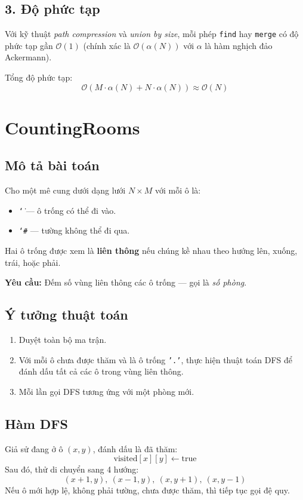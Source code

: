 \documentclass{article}
\begin{document}
	\subsection*{3. Độ phức tạp}
	Với kỹ thuật \textit{path compression} và \textit{union by size}, mỗi phép \texttt{find} hay \texttt{merge} có độ phức tạp gần $\mathcal{O}(1)$ (chính xác là $\mathcal{O}(\alpha(N))$ với $\alpha$ là hàm nghịch đảo Ackermann).
	
	Tổng độ phức tạp:
	\[
	\mathcal{O}(M \cdot \alpha(N) + N \cdot \alpha(N)) \approx \mathcal{O}(N)
	\]
	
	\section{CountingRooms}
	\subsection*{Mô tả bài toán}
	Cho một mê cung dưới dạng lưới $N \times M$ với mỗi ô là:
	\begin{itemize}
		\item \texttt{\char`\.} — ô trống có thể đi vào.
		\item \texttt{\char`\#} — tường không thể đi qua.
	\end{itemize}
	
	Hai ô trống được xem là \textbf{liên thông} nếu chúng kề nhau theo hướng lên, xuống, trái, hoặc phải.
	
	\textbf{Yêu cầu:} Đếm số vùng liên thông các ô trống — gọi là \textit{số phòng}.
	\subsection*{Ý tưởng thuật toán}
	
	\begin{enumerate}
		\item Duyệt toàn bộ ma trận.
		\item Với mỗi ô chưa được thăm và là ô trống \texttt{'.'}, thực hiện thuật toán DFS để đánh dấu tất cả các ô trong vùng liên thông.
		\item Mỗi lần gọi DFS tương ứng với một phòng mới.
	\end{enumerate}
	
	\subsection*{Hàm DFS}
	Giả sử đang ở ô $(x, y)$, đánh dấu là đã thăm:
	\[
	\text{visited}[x][y] \leftarrow \text{true}
	\]
	Sau đó, thử di chuyển sang 4 hướng:
	\[
	(x + 1, y),\ (x - 1, y),\ (x, y + 1),\ (x, y - 1)
	\]
	Nếu ô mới hợp lệ, không phải tường, chưa được thăm, thì tiếp tục gọi đệ quy.
	
\end{document}
